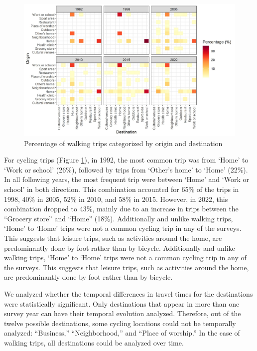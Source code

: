 \documentclass[preprint, 3p,
authoryear]{elsarticle} %
\begin{document}
\begin{figure}
\includegraphics[width=1\linewidth]{figures/cycling_hm_fig} \caption{Percentage of walking trips categorized by origin and destination}\label{fig:cycling-heatmap}
\end{figure}

For cycling trips (Figure \ref{fig:cycling-heatmap}), in 1992, the most
common trip was from `Home' to `Work or school' (26\%), followed by
trips from `Other's home' to `Home' (22\%). In all following years, the
most frequent trip were between `Home' and `Work or school' in both
direction. This combination accounted for 65\% of the trips in 1998,
40\% in 2005, 52\% in 2010, and 58\% in 2015. However, in 2022, this
combination dropped to 43\%, mainly due to an increase in trips between
the ``Grocery store'' and ``Home'' (18\%). Additionally and unlike
walking trips, `Home' to `Home' trips were not a common cycling trip in
any of the surveys. This suggests that leisure trips, such as activities
around the home, are predominantly done by foot rather than by bicycle.
Additionally and unlike walking trips, `Home' to `Home' trips were not a
common cycling trip in any of the surveys. This suggests that leisure
trips, such as activities around the home, are predominantly done by
foot rather than by bicycle.

We analyzed whether the temporal differences in travel times for the
destinations were statistically significant. Only destinations that
appear in more than one survey year can have their temporal evolution
analyzed. Therefore, out of the twelve possible destinations, some
cycling locations could not be temporally analyzed: ``Business,''
``Neighborhood,'' and ``Place of worship.'' In the case of walking
trips, all destinations could be analyzed over time.
\end{document}
